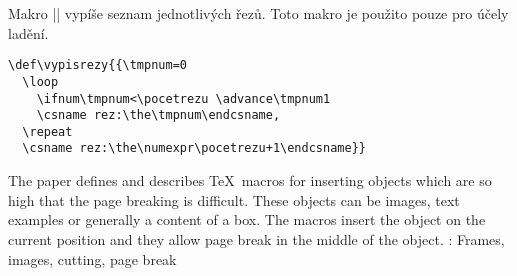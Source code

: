 \documentclass{csbulletin}
\def\JSvfil{\vfil}
\def\JSvss{\vskip0ptminus12pt}
\def\JSbreak{\break}
\begin{document}
Makro |\vypisrezy| vypíše seznam jednotlivých řezů. Toto makro je použito pouze pro účely ladění.
\begin{Verbatim}
\def\vypisrezy{{\tmpnum=0
  \loop
    \ifnum\tmpnum<\pocetrezu \advance\tmpnum1
    \csname rez:\the\tmpnum\endcsname,
  \repeat
  \csname rez:\the\numexpr\pocetrezu+1\endcsname}}
\end{Verbatim}








\iffalse
\def\refname{Seznam literatury}
\begin{thebibliography}{9}
\selectlanguage{english}
\raggedright

\bibitem{literate}
Jan Šustek. Generování dokumentovaného zdrojového souboru po blocích v~\TeX u. Zpravodaj Československého sdružení uživatelů \TeX u, 33(3--4):XX--YY, 2023.

\bibitem{rezaniweb}
Jan Šustek.
\url{https://github.com/jsustek/rezani/blob/main/rezani.tex}

\end{thebibliography}
\fi

\begingroup
\sloppy
\printbibliography
\endgroup


\begin{summary}
The paper defines and describes \TeX\ macros for inserting objects which are so high that the page breaking is difficult. These objects can be images, text examples or generally a content of a box. The macros insert the object on the current position and they allow page break in the middle of the object.
\keywords: Frames, images, cutting, page break
\end{summary}
\end{document}

